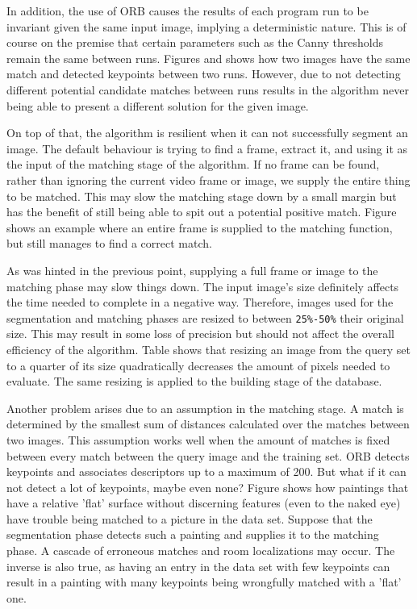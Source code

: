 	
	In addition, the use of ORB causes the results of each program run to be invariant given the same input image, implying a deterministic nature. This is of course on the premise that certain parameters such as the Canny thresholds remain the same between runs. Figures  and  shows how two images have the same match and detected keypoints between two runs. However, due to not detecting different potential candidate matches between runs results in the algorithm never being able to present a different solution for the given image.
	
	
	On top of that, the algorithm is resilient when it can not successfully segment an image. The default behaviour is trying to find a frame, extract it, and using it as the input of the matching stage of the algorithm. If no frame can be found, rather than ignoring the current video frame or image, we supply the entire thing to be matched. This may slow the matching stage down by a small margin but has the benefit of still being able to spit out a potential positive match. Figure  shows an example where an entire frame is supplied to the matching function, but still manages to find a correct match.
	
	
	As was hinted in the previous point, supplying a full frame or image to the matching phase may slow things down. The input image's size definitely affects the time needed to complete in a negative way. Therefore, images used for the segmentation and matching phases are resized to between \verb|25%-50%| their original size. This may result in some loss of precision but should not affect the overall efficiency of the algorithm. Table  shows that resizing an image from the query set to a quarter of its size quadratically decreases the amount of pixels needed to evaluate. The same resizing is applied to the building stage of the database.
	
	
	Another problem arises due to an assumption in the matching stage. A match is determined by the smallest sum of distances calculated over the matches between two images. This assumption works well when the amount of matches is fixed between every match between the query image and the training set. ORB detects keypoints and associates descriptors up to a maximum of 200. But what if it can not detect a lot of keypoints, maybe even none? Figure  shows how paintings that have a relative 'flat' surface without discerning features (even to the naked eye) have trouble being matched to a picture in the data set. Suppose that the segmentation phase detects such a painting and supplies it to the matching phase. A cascade of erroneous matches and room localizations may occur. The inverse is also true, as having an entry in the data set with few keypoints can result in a painting with many keypoints being wrongfully matched with a 'flat' one.
	
